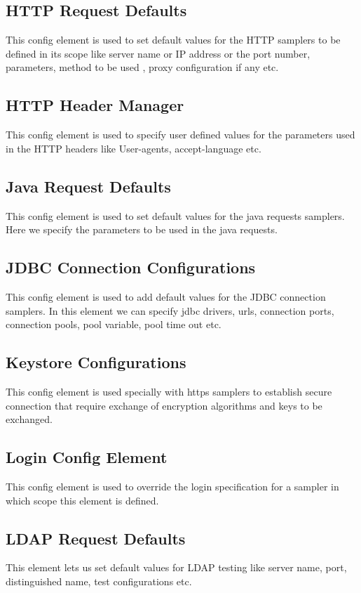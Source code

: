 \documentclass[12pt]{book}
\begin{document}
 \subsection{HTTP Request Defaults}
  This config element is used to set default values for the HTTP
samplers to be defined in its scope like server name or IP address or the port number,
parameters, method to be used , proxy configuration if any etc.

 \subsection{HTTP Header Manager}
 This config element is used to specify user defined values for
the parameters used in the HTTP headers like User-agents, accept-language etc.

 \subsection{Java Request Defaults}
 This config element is used to set default values for the java
requests samplers. Here we specify the parameters to be used in the java requests.

 \subsection{JDBC Connection Configurations}
 This config element is used to add default values for the JDBC connection samplers. In this element we can specify jdbc drivers, urls, connection
ports, connection pools, pool variable, pool time out etc.
 
 \subsection{Keystore Configurations}
 This config element is used specially with https samplers to establish secure connection that require exchange of encryption algorithms and keys to
be exchanged.

 \subsection{Login Config Element}
 This config element is used to override the login specification for a sampler in which scope this element is defined.
 
 \subsection{LDAP Request Defaults} 
 This element lets us set default values for LDAP testing like server name, port, distinguished name, test configurations etc.
 
\end{document}

